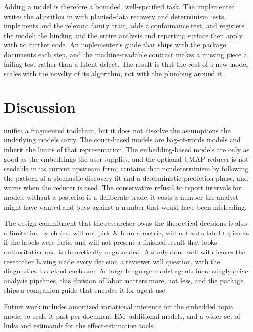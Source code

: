 \documentclass[article,nojss]{jss}
\begin{document}
Adding a model is therefore a bounded, well-specified task. The implementer
writes the algorithm in  with planted-data recovery and
determinism tests, implements  and the relevant family trait,
adds a conformance test, and registers the model; the  binding and the
entire analysis and reporting surface then apply with no further code. An
implementer's guide that ships with the package documents each step, and the
machine-readable contract makes a missing piece a failing test rather than a
latent defect. The result is that the cost of a new model scales with the novelty
of its algorithm, not with the plumbing around it.

\section{Discussion}\label{sec:discussion}

 unifies a fragmented toolchain, but it does not dissolve the
assumptions the underlying models carry. The count-based models are bag-of-words
models and inherit the limits of that representation. The embedding-based models
are only as good as the embeddings the user supplies, and the optional UMAP
reducer is not seedable in its current upstream form;  contains that
nondeterminism by following the  pattern of a stochastic discovery
fit and a deterministic prediction phase, and warns when the reducer is used. The
conservative refusal to report intervals for models without a posterior is a
deliberate trade: it costs a number the analyst might have wanted and buys against
a number that would have been misleading.

The design commitment that the researcher owns the theoretical decisions is also
a limitation by choice.  will not pick $K$ from a metric, will not
auto-label topics as if the labels were facts, and will not present a finished
result that looks authoritative and is theoretically ungrounded. A study done
well with  leaves the researcher having made every decision a reviewer
will question, with the diagnostics to defend each one. As large-language-model
agents increasingly drive analysis pipelines, this division of labor matters more,
not less, and the package ships a companion guide that encodes it for agent use.

Future work includes amortized variational inference for the embedded topic model
to scale it past per-document EM, additional models, and a wider set of links and
estimands for the effect-estimation tools.
\end{document}
